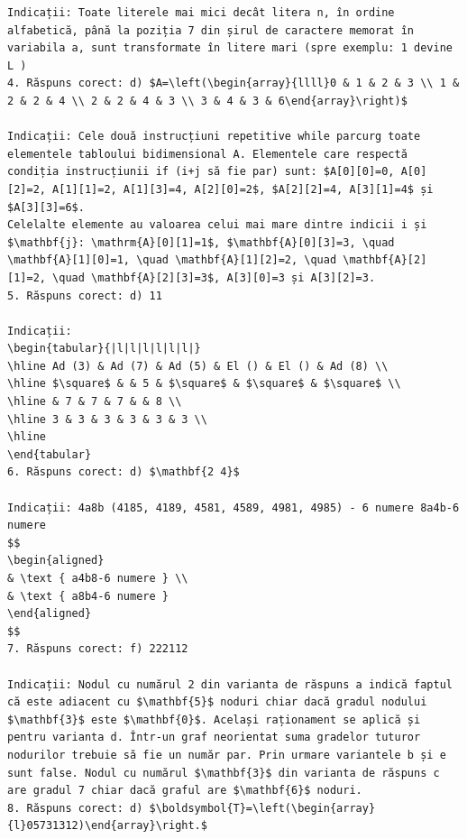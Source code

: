 \documentclass[10pt]{article}
\begin{document}
\begin{verbatim}
Indicații: Toate literele mai mici decât litera n, în ordine alfabetică, până la poziția 7 din șirul de caractere memorat în variabila a, sunt transformate în litere mari (spre exemplu: 1 devine L )
4. Răspuns corect: d) $A=\left(\begin{array}{llll}0 & 1 & 2 & 3 \\ 1 & 2 & 2 & 4 \\ 2 & 2 & 4 & 3 \\ 3 & 4 & 3 & 6\end{array}\right)$

Indicații: Cele două instrucțiuni repetitive while parcurg toate elementele tabloului bidimensional A. Elementele care respectă condiția instrucțiunii if (i+j să fie par) sunt: $A[0][0]=0, A[0][2]=2, A[1][1]=2, A[1][3]=4, A[2][0]=2$, $A[2][2]=4, A[3][1]=4$ și $A[3][3]=6$.
Celelalte elemente au valoarea celui mai mare dintre indicii i și $\mathbf{j}: \mathrm{A}[0][1]=1$, $\mathbf{A}[0][3]=3, \quad \mathbf{A}[1][0]=1, \quad \mathbf{A}[1][2]=2, \quad \mathbf{A}[2][1]=2, \quad \mathbf{A}[2][3]=3$, A[3][0]=3 și A[3][2]=3.
5. Răspuns corect: d) 11

Indicații:
\begin{tabular}{|l|l|l|l|l|l|}
\hline Ad (3) & Ad (7) & Ad (5) & El () & El () & Ad (8) \\
\hline $\square$ & & 5 & $\square$ & $\square$ & $\square$ \\
\hline & 7 & 7 & 7 & & 8 \\
\hline 3 & 3 & 3 & 3 & 3 & 3 \\
\hline
\end{tabular}
6. Răspuns corect: d) $\mathbf{2 4}$

Indicații: 4a8b (4185, 4189, 4581, 4589, 4981, 4985) - 6 numere 8a4b-6 numere
$$
\begin{aligned}
& \text { a4b8-6 numere } \\
& \text { a8b4-6 numere }
\end{aligned}
$$
7. Răspuns corect: f) 222112

Indicații: Nodul cu numărul 2 din varianta de răspuns a indică faptul că este adiacent cu $\mathbf{5}$ noduri chiar dacă gradul nodului $\mathbf{3}$ este $\mathbf{0}$. Același raționament se aplică și pentru varianta d. Într-un graf neorientat suma gradelor tuturor nodurilor trebuie să fie un număr par. Prin urmare variantele b și e sunt false. Nodul cu numărul $\mathbf{3}$ din varianta de răspuns c are gradul 7 chiar dacă graful are $\mathbf{6}$ noduri.
8. Răspuns corect: d) $\boldsymbol{T}=\left(\begin{array}{l}05731312)\end{array}\right.$


\end{verbatim}
\end{document}
